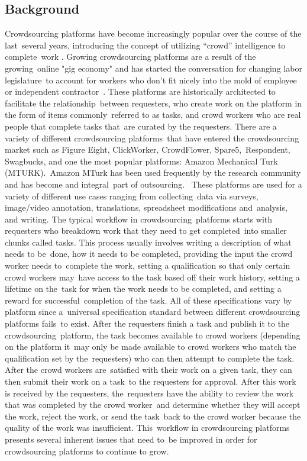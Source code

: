 \documentclass[letterpaper,12pt]{article}
\begin{document}
\subsection{Background}
Crowdsourcing platforms have become increasingly popular over the course of the last\ 
several years, introducing the concept of utilizing ``crowd'' intelligence to complete\
work \cite{kuek2015global}. Growing crowdsourcing platforms are a result of the growing\
online "gig economy" and has started the conversation for changing labor legislature\
to account for workers who don't fit nicely into the mold of employee or independent contractor\
\cite{harris2015proposal}.
These platforms are historically architected to facilitate the relationship\ 
between requesters, who create work on the platform in the form of items commonly\ 
referred to as tasks, and crowd workers who are real people that complete tasks that\ 
are curated by the requesters. There are a variety of different crowdsourcing platforms\ 
that have entered the crowdsourcing market such as Figure Eight, ClickWorker, CrowdFlower, Spare5,\ 
Respondent, Swagbucks, and one the most popular platforms: Amazon Mechanical Turk (MTURK).\ 
Amazon MTurk has been used frequently by the research community and has become and integral\
part of outsourcing. \cite{hitlin2016research}\ 
These platforms are used for a variety of different use cases ranging from collecting\
data via surveys, image/video annotation, translations, spreadsheet modifications and\ 
analysis, and writing. \cite{ipeirotis2010Analysis} The typical workflow in crowdsourcing\ 
platforms starts with requesters who breakdown work that they need to get completed\ 
into smaller chunks called tasks. This process usually involves writing a description of what needs to be\ 
done, how it needs to be completed, providing the input the crowd worker needs to\ 
complete the work, setting a qualification so that only certain crowd workers may\ 
have access to the task based off their work history, setting a lifetime on the\ 
task for when the work needs to be completed, and setting a reward for successful\ 
completion of the task. All of these specifications vary by platform since a\ 
universal specification standard between different crowdsourcing platforms fails\ 
to exist. \cite{allahbakhsh2013quality} After the requesters finish a task and publish it to the crowdsourcing\ 
platform, the task becomes available to crowd workers (depending on the platform it\ 
may only be made available to crowd workers who match the qualification set by the\ 
requesters) who can then attempt to complete the task. After the crowd workers are\ 
satisfied with their work on a given task, they can then submit their work on a task\ 
to the requesters for approval. After this work is received by the requesters, the\ 
requesters have the ability to review the work that was completed by the crowd worker\
and determine whether they will accept the work, reject the work, or send the task\ 
back to the crowd worker because the quality of the work was insufficient. This\ 
workflow in crowdsourcing platforms presents several inherent issues that need to\ 
be improved in order for crowdsourcing platforms to continue to grow.
\end{document}
